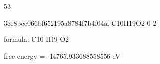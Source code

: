 \documentclass{article}
\begin{document}
53

\vspace{1cm}


3ce8bce066bf652195a8784f7b4f04af-C10H19O2-0-2



formula: C10 H19 O2



free energy = -14765.933688558556 eV
\end{document}

